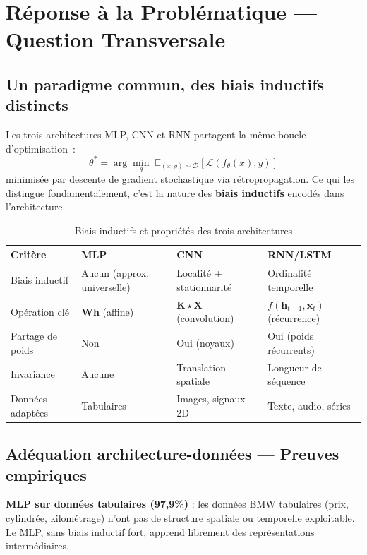 \documentclass[12pt,a4paper]{report}
\begin{document}
\section{Réponse à la Problématique --- Question Transversale}

\begin{newbox}

\subsection*{Un paradigme commun, des biais inductifs distincts}

Les trois architectures MLP, CNN et RNN partagent la même boucle d'optimisation~:
\[
  \theta^* = \arg\min_\theta \;\mathbb{E}_{(x,y)\sim\mathcal{D}}\!\left[\mathcal{L}(f_\theta(x), y)\right]
\]
minimisée par descente de gradient stochastique via rétropropagation. Ce qui les distingue
fondamentalement, c'est la nature des \textbf{biais inductifs} encodés dans l'architecture.

\begin{table}[H]
\centering
\caption{Biais inductifs et propriétés des trois architectures}
\begin{tabularx}{\textwidth}{lXXX}
\toprule
\textbf{Critère} & \textbf{MLP} & \textbf{CNN} & \textbf{RNN/LSTM} \\
\midrule
Biais inductif & Aucun (approx. universelle) & Localité + stationnarité & Ordinalité temporelle \\
Opération clé & $\mathbf{W}\mathbf{h}$ (affine) & $\mathbf{K}\star\mathbf{X}$ (convolution) & $f(\mathbf{h}_{t-1}, \mathbf{x}_t)$ (récurrence) \\
Partage de poids & Non & Oui (noyaux) & Oui (poids récurrents) \\
Invariance & Aucune & Translation spatiale & Longueur de séquence \\
Données adaptées & Tabulaires & Images, signaux 2D & Texte, audio, séries \\
\bottomrule
\end{tabularx}
\end{table}

\subsection*{Adéquation architecture-données --- Preuves empiriques}

\textbf{MLP sur données tabulaires (97,9\%)} : les données BMW tabulaires (prix, cylindrée,
kilométrage) n'ont pas de structure spatiale ou temporelle exploitable. Le MLP, sans biais 
inductif fort, apprend librement des représentations intermédiaires.


\end{newbox}
\end{document}
